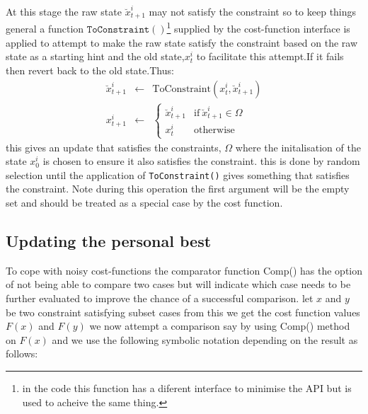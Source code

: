 \documentclass[a4paper,oneside,english]{book}
\numberwithin{equation}{section}
\numberwithin{figure}{section}
\begin{document}
At this stage the raw state $\breve{x}_{t+1}^i$ may not satisfy the constraint so to keep things general a function $\mathtt{ToConstraint()}$\footnote{in the code this function has a diferent interface to minimise the API but is used to acheive the same thing.} supplied by the cost-function interface is applied  to attempt to make the raw state  satisfy the constraint based on the raw state as a starting hint and the old state,$x_t^i$ to facilitate this attempt.If it fails then revert back to the old state.Thus: 
\begin{align}
\breve{x}_{t+1}^i&\leftarrow&\mathrm{ToConstraint}(x_t^i,\breve{x}_{t+1}^i)\\
x_{t+1}^i &\leftarrow& \left\lbrace
\begin{array}{cc}
\breve{x}_{t+1}^i& \mathrm{if}\: \breve{x}_{t+1}^i \in \Omega\\
x_t^i&\mathrm{otherwise}
\end{array}\right.
\end{align} 
this gives an update that satisfies the constraints, $\Omega$ where  the initalisation of the state $x_0^i$ is chosen to ensure it also satisfies the constraint. this is done by random selection until the application of  \texttt{ToConstraint()} gives something that satisfies the constraint. Note during this operation the first argument will be the empty set and should be treated as a special case by the cost function.

\subsection{Updating the personal best}
To cope with noisy cost-functions the comparator function Comp() has the option of not being able to compare two  cases but will indicate which case needs to be further evaluated to improve the chance of a successful  comparison. let $x$  and $y$ be two constraint satisfying subset cases from this we get the cost function values $F(x)$ and $F(y)$ we now attempt a comparison say by using Comp() method on $F(x)$ and we use the  following symbolic notation depending on the result as follows:
\end{document}
